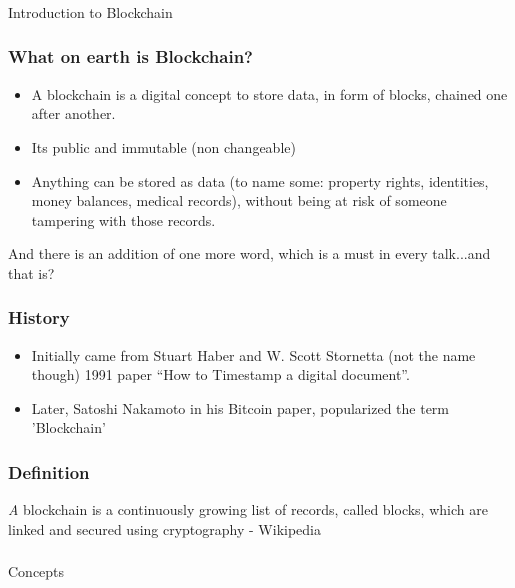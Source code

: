 \begin{frame}[fragile]\frametitle{}
\begin{center}
{\Large Introduction to Blockchain}
\end{center}
\end{frame}

\begin{frame}[fragile]\frametitle{What on earth is Blockchain?}
\begin{itemize}
\item A blockchain is a digital concept to store data, in form of blocks, chained one after another.
\item Its public and immutable (non changeable)
\item Anything can be stored as data (to name some: property rights, identities, money balances, medical records), without being at risk of someone tampering with those records.
\end{itemize}


And there is an addition of one more word,  which is a must in every talk...and that is?


\end{frame}

\begin{frame}[fragile]\frametitle{History}
\begin{itemize}
\item Initially came from Stuart Haber and W. Scott Stornetta (not the name though) 1991 paper ``How to Timestamp a digital document''.
\item Later, Satoshi Nakamoto in his Bitcoin paper, popularized the term 'Blockchain'
\end{itemize}
\end{frame}

\begin{frame}[fragile]\frametitle{Definition}
{\emph A blockchain is a continuously growing list of records, called blocks, which are linked and secured using cryptography - Wikipedia}

\end{frame}


\begin{frame}[fragile]\frametitle{}
\begin{center}
{\Large Concepts}
\end{center}
\end{frame}

